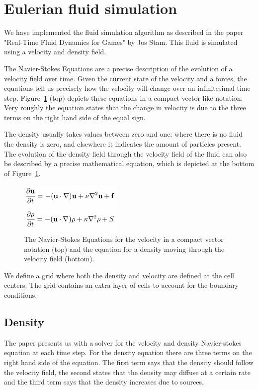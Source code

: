 \section{Eulerian fluid simulation}

We have implemented the fluid simulation algorithm as described in the paper "Real-Time Fluid Dynamics for Games" by Jos Stam.
This fluid is simulated using a velocity and density field.

\noindent The Navier-Stokes Equations are a precise description of the evolution of a velocity field over time.
Given the current state of the velocity and a forces, the equations tell us precisely how the velocity will change over an infinitesimal time step.
Figure~\ref{fig:navierstokes} (top) depicts these equations in a compact vector-like notation.
Very roughly the equation states that the change in velocity is due to the three terms on the right hand side of the equal sign.

\noindent The density usually takes values between zero and one: where there is no fluid the density is zero, and elsewhere it indicates the amount of particles present.
The evolution of the density field through the velocity field of the fluid can also be described by a precise mathematical equation,
which is depicted at the bottom of Figure~\ref{fig:navierstokes}.

\begin{figure}[h]
    \centering
    \includegraphics[width=5cm]{img/navierstokes.png}
    \caption{The Navier-Stokes Equations for the velocity in a compact vector notation (top) and the equation for a density moving through the velocity field (bottom).}
    \label{fig:navierstokes}
\end{figure}

\noindent We define a grid where both the density and velocity are defined at the cell centers.
The grid contains an extra layer of cells to account for the boundary conditions.

\subsection{Density}
The paper presents us with a solver for the velocity and density Navier-stokes equation at each time step.
For the density equation there are three terms on the right hand side of the equation.
The first term says that the density should follow the velocity field, the second states that the density may diffuse at a certain rate and the third term says that the density increases due to sources.

